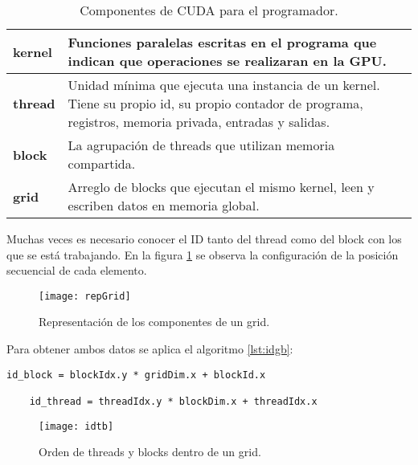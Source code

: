      \begin{table}[h!]
      \begin{center}
            \footnotesize
        \begin{tabular}{|m{1.5cm}|m{8.5cm}|}
         \hline
         \cellcolor{lightgray}\textbf{kernel} & Funciones paralelas escritas en el programa que indican que operaciones se realizaran en la GPU.\\ 
         \hline
          \cellcolor{lightgray}\textbf{thread} & Unidad mínima que ejecuta una instancia de un kernel. Tiene su propio id, su propio contador de programa, registros, memoria privada, entradas y salidas.\\ 
         \hline  
         \cellcolor{lightgray}\textbf{block} & La agrupación de threads que utilizan memoria compartida.\\ 
         \hline
         \cellcolor{lightgray}\textbf{grid} & Arreglo de blocks que ejecutan el mismo kernel, leen y escriben datos en memoria global.\\ 
         \hline
           \end{tabular}
        \caption{Componentes de CUDA para el programador.}
        \label{tab:CUDAcomp}
      \end{center}
    \end{table}
    
    Muchas veces es necesario conocer el ID tanto del thread como del block con los que se está trabajando. En la figura \ref{fig:grid} se observa la configuración de la posición secuencial de cada elemento.
    \newline
    
    \begin{figure}[ht]
      \centering
        \texttt{[image: repGrid]}
        \caption{Representación de los componentes de un grid\cite{CUDAP}.}
        \label{fig:grid}
    \end{figure}

    Para obtener ambos datos se aplica el algoritmo \ref{lst:idgb}:
    
    \begin{lstlisting}[style=CStyle, frame=single,label=lst:idgb,  basicstyle=\ttfamily\footnotesize, caption=Transformación para obtener el id del thread y del block.] 
    id_block = blockIdx.y * gridDim.x + blockId.x
    
    id_thread = threadIdx.y * blockDim.x + threadIdx.x
    \end{lstlisting}
    
    \begin{figure}[ht]
      \centering
        \texttt{[image: idtb]}
        \caption{Orden de threads y blocks dentro de un grid\cite{CUDAP}.}
        \label{fig:threadOrden}
    \end{figure}
    
